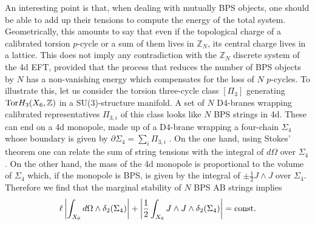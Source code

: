 \documentclass[11pt]{article}
\def\be{\begin{equation}}
\def\ee{\end{equation}}
\def\oh{\frac{1}{2}}
\def\p {{\partial}}
\newcommand{\IZ}{\mathbb{Z}}
\begin{document}
An interesting point is that, when dealing with mutually BPS objects, one should be able to add up their tensions to compute the energy of the total system. Geometrically, this amounts to say that even if the topological charge of a calibrated torsion $p$-cycle or a sum of them lives in $\IZ_N$, its central charge lives in a lattice. This does not imply any contradiction with the $\IZ_N$ discrete system of the 4d EFT, provided that the process that reduces the number of BPS objects by $N$ has a non-vanishing energy which compensates for the loss of $N$ $p$-cycles. To illustrate this, let us consider the torsion three-cycle class $[\Pi_3]$ generating ${\rm Tor} H_3(X_6, \IZ)$ in a SU(3)-structure manifold. A set of $N$ D4-branes wrapping calibrated representatives $\Pi_{3,i}$ of this class looks like $N$ BPS strings in 4d. These can end on a 4d monopole, made up of a D4-brane wrapping a four-chain $\Sigma_4$ whose boundary is given by $\p \Sigma_4= \sum_i \Pi_{3,i}$ \cite{Camara:2011jg}. On the one hand, using Stokes' theorem one can relate the sum of string tensions with the integral of $d\Omega$ over $\Sigma_4$. On the other hand, the mass of the 4d monopole is proportional to the volume of $\Sigma_4$ which, if the monopole is BPS, is given by the integral of $\pm \oh J \wedge J$ over $\Sigma_4$. Therefore we find that the marginal stability of $N$ BPS AB strings implies
 \be
\ell \left| \int_{X_6} d\Omega \wedge \delta_2(\Sigma_4)\right| + \left| \oh \int_{X_6} J \wedge J  \wedge \delta_2(\Sigma_4) \right| = {\rm const.} 
\label{BPSmono}
\ee
\end{document}

